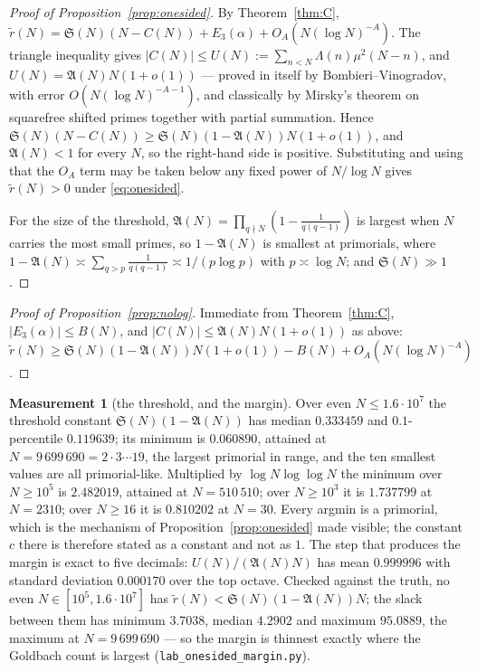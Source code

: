 \documentclass[11pt,a4paper]{article}
\theoremstyle{plain}
\theoremstyle{definition}
\newtheorem{measurement}[theorem]{Measurement}
\theoremstyle{remark}
\renewcommand{\SS}{\mathfrak{S}}
\newcommand{\AAA}{\mathfrak{A}}
\begin{document}
\begin{proof}[Proof of Proposition~\ref{prop:onesided}]
By Theorem~\ref{thm:C},
$\tilde r(N)=\SS(N)(N-C(N))+E_3(\alpha)+O_A(N(\log N)^{-A})$. The
triangle inequality gives
$|C(N)|\le U(N):=\sum_{n<N}\Lambda(n)\mu^2(N-n)$, and
$U(N)=\AAA(N)N(1+o(1))$ --- proved in \cite[\S3.3]{HL} itself by
Bombieri--Vinogradov, with error $O(N(\log N)^{-A-1})$, and classically
by Mirsky's theorem on squarefree shifted
primes \cite{Mir49} together with partial summation. Hence
$\SS(N)(N-C(N))\ge\SS(N)(1-\AAA(N))N(1+o(1))$, and $\AAA(N)<1$ for
every $N$, so the right-hand side is positive. Substituting and using
that the $O_A$ term may be taken below any fixed power of $N/\log N$
gives $\tilde r(N)>0$ under \eqref{eq:onesided}.

For the size of the threshold, $\AAA(N)=\prod_{q\nmid N}
(1-\tfrac1{q(q-1)})$ is largest when $N$ carries the most small
primes, so $1-\AAA(N)$ is smallest at primorials, where
$1-\AAA(N)\asymp\sum_{q>p}\tfrac1{q(q-1)}\asymp1/(p\log p)$ with
$p\asymp\log N$; and $\SS(N)\gg1$.
\end{proof}

\begin{proof}[Proof of Proposition~\ref{prop:nolog}]
Immediate from Theorem~\ref{thm:C}, $|E_3(\alpha)|\le B(N)$, and
$|C(N)|\le\AAA(N)N(1+o(1))$ as above:
$\tilde r(N)\ge\SS(N)(1-\AAA(N))N(1+o(1))-B(N)
+O_A(N(\log N)^{-A})$.
\end{proof}

\begin{measurement}[the threshold, and the margin]\label{meas:margin}
Over even $N\le1.6\cdot10^7$ the threshold constant
$\SS(N)(1-\AAA(N))$ has median $0.333459$ and $0.1$-percentile
$0.119639$; its minimum is $0.060890$, attained at
$N=9\,699\,690=2\cdot3\cdots19$, the largest primorial in range, and
the ten smallest values are all primorial-like. Multiplied by
$\log N\log\log N$ the minimum over $N\ge10^5$ is $2.482019$, attained
at $N=510\,510$; over $N\ge10^3$ it is $1.737799$ at $N=2310$; over
$N\ge16$ it is $0.810202$ at $N=30$. Every argmin is a primorial,
which is the mechanism of Proposition~\ref{prop:onesided} made
visible; the constant $c$ there is therefore stated as a constant and
not as $1$. The step that produces the margin is exact to five
decimals: $U(N)/(\AAA(N)N)$ has mean $0.999996$ with standard
deviation $0.000170$ over the top octave. Checked against the truth,
no even $N\in[10^5,1.6\cdot10^7]$ has
$\tilde r(N)<\SS(N)(1-\AAA(N))N$; the slack between them has minimum
$3.7038$, median $4.2902$ and maximum $95.0889$, the maximum at
$N=9\,699\,690$ --- so the margin is thinnest exactly where the
Goldbach count is largest
(\texttt{lab\_onesided\_margin.py}).
\end{measurement}
\end{document}
